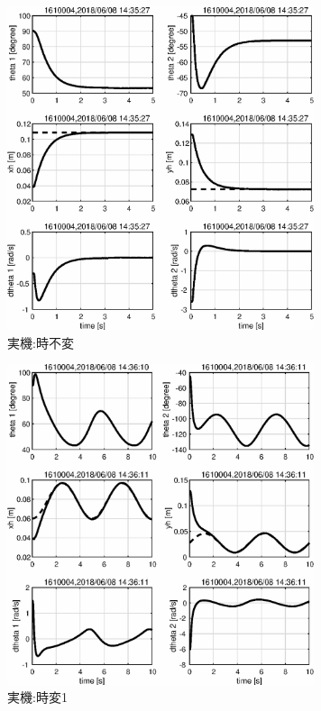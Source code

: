 \documentclass[a4paper,11pt,titlepage]{jsarticle}
\begin{document}
{\begin{figure}[H]
  \begin{center}
    \includegraphics[width = 9cm]{画像/eps_実機実験_手先_時不変_時間応答}
    \caption{実機:時不変}
    \label{手先1/実機}
  \end{center}
\end{figure}

\begin{figure}[H]
  \begin{center}
    \includegraphics[width = 9cm]{画像/eps_実機実験_手先_時変1_時間応答}
    \caption{実機:時変1}
    \label{手先2/実機}
  \end{center}
\end{figure}

}
\end{document}
